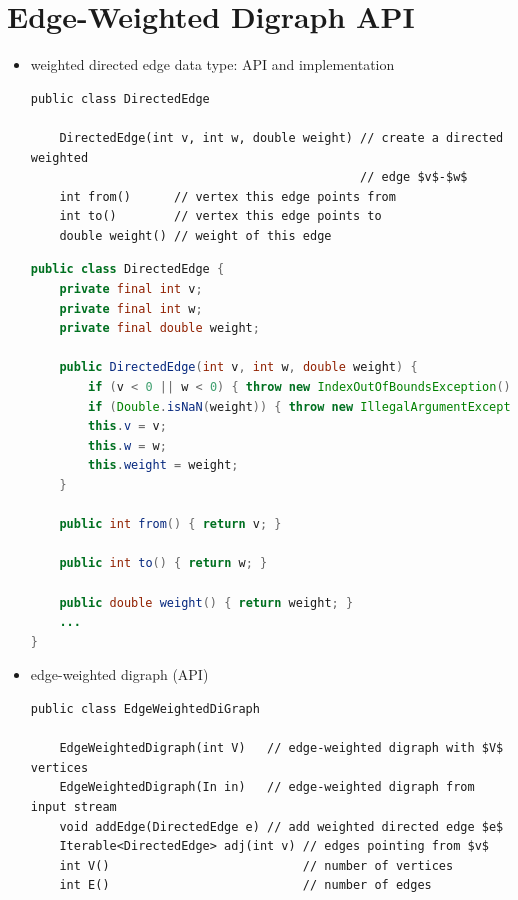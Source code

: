 \documentclass[8pt,a4paper,compress]{beamer}
\begin{document}
\section{Edge-Weighted Digraph API}
\begin{frame}[fragile]
\begin{itemize}
\item weighted directed edge data type: API and implementation
\begin{lstlisting}[language={},mathescape]
public class DirectedEdge

    DirectedEdge(int v, int w, double weight) // create a directed weighted 
                                              // edge $v$-$w$
    int from()      // vertex this edge points from
    int to()        // vertex this edge points to
    double weight() // weight of this edge
\end{lstlisting}

\begin{lstlisting}[language=Java]
public class DirectedEdge { 
    private final int v;
    private final int w;
    private final double weight;
    
    public DirectedEdge(int v, int w, double weight) {
        if (v < 0 || w < 0) { throw new IndexOutOfBoundsException(); }
        if (Double.isNaN(weight)) { throw new IllegalArgumentException(); }
        this.v = v;
        this.w = w;
        this.weight = weight;
    }

    public int from() { return v; }

    public int to() { return w; }

    public double weight() { return weight; }
    ...
}
\end{lstlisting}
\end{itemize}
\end{frame}

\begin{frame}[fragile]
\begin{itemize}
\item edge-weighted digraph (API)
\begin{lstlisting}[language={},mathescape]
public class EdgeWeightedDiGraph

    EdgeWeightedDigraph(int V)   // edge-weighted digraph with $V$ vertices
    EdgeWeightedDigraph(In in)   // edge-weighted digraph from input stream
    void addEdge(DirectedEdge e) // add weighted directed edge $e$
    Iterable<DirectedEdge> adj(int v) // edges pointing from $v$
    int V()                           // number of vertices
    int E()                           // number of edges
\end{lstlisting}
\end{itemize}
\end{frame}
\end{document}
